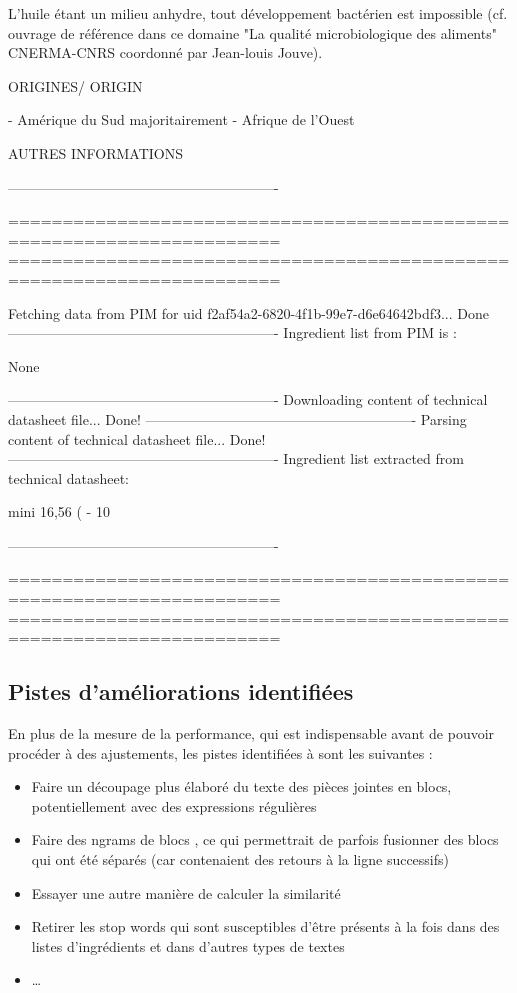 \begin{spacing}{1.0}
{{\begin{spverbatim}
L’huile étant un milieu anhydre, tout développement bactérien est impossible (cf. ouvrage de 
référence  dans  ce  domaine  "La  qualité  microbiologique  des  aliments"  CNERMA-CNRS 
coordonné par Jean-louis Jouve). 
    
ORIGINES/ ORIGIN 
    
- Amérique du Sud majoritairement 
- Afrique de l’Ouest 
    
AUTRES INFORMATIONS 
    

----------------------------------------------------------

=======================================================================
=======================================================================

Fetching data from PIM for uid f2af54a2-6820-4f1b-99e7-d6e64642bdf3...
Done
----------------------------------------------------------
Ingredient list from PIM is :

None

----------------------------------------------------------
Downloading content of technical datasheet file...
Done!
----------------------------------------------------------
Parsing content of technical datasheet file...
Done!
----------------------------------------------------------
Ingredient list extracted from technical datasheet:

mini 16,56 ( - 10 %

----------------------------------------------------------

=======================================================================
=======================================================================  
                \end{spverbatim}
                }
                }
                \end{spacing}

            \subsection{Pistes d'améliorations identifiées}

            En plus de la mesure de la performance, qui est indispensable avant de pouvoir procéder à des ajustements, les pistes identifiées à sont les suivantes :
            \begin{itemize}
                \item Faire un découpage plus élaboré du texte des pièces jointes en blocs, potentiellement avec des expressions régulières
                \item Faire des \og ngrams de blocs \og, ce qui permettrait de parfois fusionner des blocs qui ont été séparés (car contenaient des retours à la ligne successifs)
                \item Essayer une autre manière de calculer la similarité
                \item Retirer les stop words qui sont susceptibles d'être présents à la fois dans des listes d'ingrédients et dans d'autres types de textes
                \item \dots
            \end{itemize}

